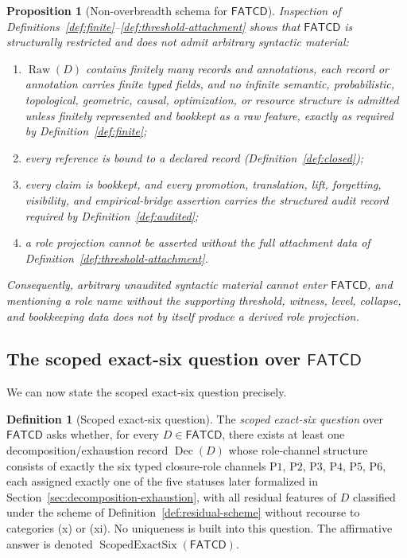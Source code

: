 \documentclass[11pt]{article}
\newtheorem{proposition}[theorem]{Proposition}
\theoremstyle{definition}
\newtheorem{definition}[theorem]{Definition}
\newcommand{\FATCD}{\ensuremath{\mathsf{FATCD}}}
\newcommand{\Raw}[1]{\ensuremath{\operatorname{Raw}\!\left(#1\right)}}
\newcommand{\Dec}[1]{\ensuremath{\operatorname{Dec}\!\left(#1\right)}}
\newcommand{\ScopedExactSix}[1]{\ensuremath{\operatorname{ScopedExactSix}\!\left(#1\right)}}
\newcommand{\Pone}{\ensuremath{\mathrm{P1}}}
\newcommand{\Ptwo}{\ensuremath{\mathrm{P2}}}
\newcommand{\Pthree}{\ensuremath{\mathrm{P3}}}
\newcommand{\Pfour}{\ensuremath{\mathrm{P4}}}
\newcommand{\Pfive}{\ensuremath{\mathrm{P5}}}
\newcommand{\Psix}{\ensuremath{\mathrm{P6}}}
\begin{document}
\begin{proposition}[Non-overbreadth schema for \FATCD{}]\label{prop:non-overbreadth}
Inspection of Definitions~\ref{def:finite}--\ref{def:threshold-attachment}
shows that \FATCD{} is structurally restricted and does not admit arbitrary
syntactic material:
\begin{enumerate}[label=(\roman*),topsep=2pt,itemsep=1pt]
  \item \(\Raw{D}\) contains finitely many records and annotations, each
    record or annotation carries finite typed fields, and no infinite
    semantic, probabilistic, topological, geometric, causal, optimization, or
    resource structure is admitted unless finitely represented and bookkept as
    a raw feature, exactly as required by Definition~\ref{def:finite};
  \item every reference is bound to a declared record
    (Definition~\ref{def:closed});
  \item every claim is bookkept, and every promotion, translation, lift,
    forgetting, visibility, and empirical-bridge assertion carries the
    structured audit record required by
    Definition~\ref{def:audited};
  \item a role projection cannot be asserted without the full attachment
    data of Definition~\ref{def:threshold-attachment}.
\end{enumerate}
Consequently, arbitrary unaudited syntactic material cannot enter \FATCD{},
and mentioning a role name without the supporting threshold, witness, level,
collapse, and bookkeeping data does not by itself produce a derived role
projection.
\end{proposition}

\subsection{The scoped exact-six question over \FATCD{}}\label{subsec:scoped-exact-six-question}

We can now state the scoped exact-six question precisely.

\begin{definition}[Scoped exact-six question]\label{def:scoped-exact-six-question}
The \emph{scoped exact-six question} over \FATCD{} asks whether, for every
\(D \in \FATCD{}\), there exists at least one decomposition/exhaustion record
\(\Dec{D}\) whose role-channel structure consists of exactly the six typed
closure-role channels \Pone{}, \Ptwo{}, \Pthree{}, \Pfour{}, \Pfive{},
\Psix{}, each assigned exactly one of the five statuses later formalized in
Section~\ref{sec:decomposition-exhaustion}, with all residual features of
\(D\) classified under the scheme of Definition~\ref{def:residual-scheme}
without recourse to categories (x) or (xi). No uniqueness is built into this
question. The affirmative answer is denoted \(\ScopedExactSix{\FATCD{}}\).
\end{definition}
\end{document}
